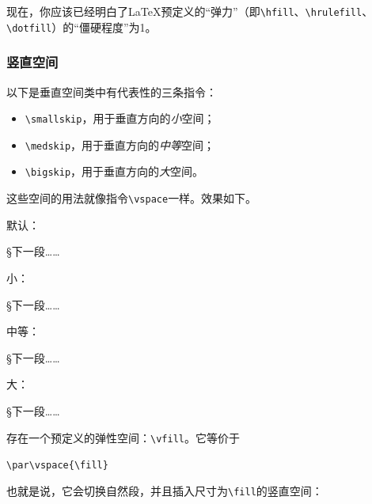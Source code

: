 现在，你应该已经明白了\LaTeX 预定义的“弹力”（即\verb|\hfill|、\verb|\hrulefill|、\verb|\dotfill|）的“僵硬程度”为1。

\subsubsection{竖直空间}

以下是垂直空间类中有代表性的三条指令：

\begin{itemize}
  \item \verb|\smallskip|，用于垂直方向的\emph{小}空间；
  \item \verb|\medskip|，用于垂直方向的\emph{中等}空间；
  \item \verb|\bigskip|，用于垂直方向的\emph{大}空间。
\end{itemize}

这些空间的用法就像指令\verb|\vspace|一样。效果如下。

\begin{center}
  \begin{minipage}[t]{0.2\textwidth}
  默认：
  \par
  \S 下一段……
  \end{minipage}
  \begin{minipage}[t]{0.2\textwidth}
  小：
  \par\smallskip
  \S 下一段……
  \end{minipage}
  \begin{minipage}[t]{0.2\textwidth}
  中等：
  \par\medskip
  \S 下一段……
  \end{minipage}
  \begin{minipage}[t]{0.2\textwidth}
  大：
  \par\bigskip
  \S 下一段……
  \end{minipage}
  \end{center}

存在一个预定义的弹性空间：\verb|\vfill|。它等价于

\begin{dmd}
\verb|\par\vspace{\fill}|
\end{dmd}

也就是说，它会切换自然段，并且插入尺寸为\verb|\fill|的竖直空间：

